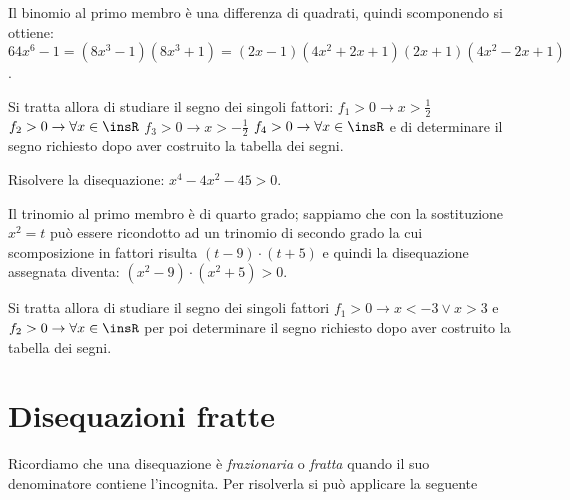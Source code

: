 \begin{exrig}
\begin{esempio}
Il binomio al primo membro è una differenza di quadrati, quindi scomponendo si 
ottiene: $64x^6-1=(8x^3-1)(8x^3+1)=(2x-1)(4x^2+2x+1)(2x+1)(4x^2-2x+1)$.

Si tratta allora di studiare il segno dei singoli fattori: $f_1>0\to x>\frac 1 
2$ $f_2>0\to \forall x\in \insR$ $f_3>0\to x>-\frac 1 2$ $f_4>0\to \forall x\in 
\insR$ e di determinare il segno richiesto dopo aver costruito la tabella dei 
segni.
\end{esempio}

\begin{esempio}
Risolvere la disequazione: $x^4-4x^2-45>0$.

Il trinomio al primo membro è di quarto grado; sappiamo che con la sostituzione 
$x^2=t$ può essere ricondotto ad un trinomio di secondo grado la cui 
scomposizione in fattori risulta $(t-9)\cdot (t+5)$ e quindi la disequazione 
assegnata diventa: $(x^2-9)\cdot (x^2+5)>0$.

Si tratta allora di studiare il segno dei singoli fattori $f_1>0\to x<-3\vee 
x>3$ e $f_2>0\to \forall x\in \insR$ per poi determinare il segno richiesto dopo 
aver costruito la tabella dei segni.
\end{esempio}
\end{exrig}
% 

\section{Disequazioni fratte}
\label{sec:diseq_fratte}

Ricordiamo che una disequazione è \emph{frazionaria} o \emph{fratta} quando il 
suo denominatore contiene l'incognita. Per risolverla si può applicare la 
seguente


